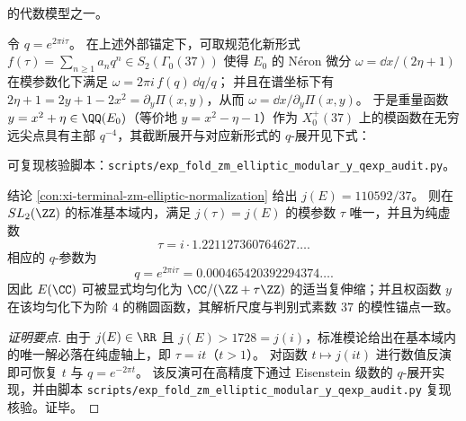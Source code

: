 \begin{remark}
\)
的代数模型之一。\cite{LMFDBEllipticCurve37a1}
\par
令 \(q=e^{2\pi i\tau}\)。
在上述外部锚定下，可取规范化新形式 \(f(\tau)=\sum_{n\ge 1}a_n q^n\in S_2(\Gamma_0(37))\) 使得 \(E_0\) 的 N\'eron 微分 \(\omega=\dd x/(2\eta+1)\) 在模参数化下满足
\(
\omega=2\pi i\, f(q)\,\dd q/q
\)；
并且在谱坐标下有 \(2\eta+1=2y+1-2x^2=\partial_y\Pi(x,y)\)，从而 \(\omega=\dd x/\partial_y\Pi(x,y)\)。
于是重量函数 \(y=x^{2}+\eta\in\QQ(E_0)\)（等价地 \(y=x^{2}-\eta-1\)）作为 \(X_0^+(37)\) 上的模函数在无穷远尖点具有主部 \(q^{-4}\)，其截断展开与对应新形式的 \(q\)-展开见下式：

可复现核验脚本：\texttt{scripts/exp\_fold\_zm\_elliptic\_modular\_y\_qexp\_audit.py}。
\end{remark}

\begin{conclusion}\label{con:xi-terminal-zm-elliptic-j-inversion-tau}
结论 \ref{con:xi-terminal-zm-elliptic-normalization} 给出
\(
j(E)=110592/37
\)。
则在 \(SL_{2}(\ZZ)\) 的标准基本域内，满足 \(j(\tau)=j(E)\) 的模参数 \(\tau\) 唯一，并且为纯虚数
\[
\tau=i\cdot 1.221127360764627\ldots.
\]
相应的
\(
q
\)-参数为
\[
q=e^{2\pi i\tau}=0.000465420392294374\ldots.
\]
因此 \(E(\CC)\) 可被显式均匀化为 \(\CC/(\ZZ+\tau\ZZ)\) 的适当复伸缩；并且权函数 \(y\) 在该均匀化下为阶 \(4\) 的椭圆函数，其解析尺度与判别式素数 \(37\) 的模性锚点一致。
\end{conclusion}
\begin{proof}[证明要点]
由于 \(j(E)\in\RR\) 且 \(j(E)>1728=j(i)\)，标准模论给出在基本域内的唯一解必落在纯虚轴上，即 \(\tau=it\)（\(t>1\)）。
对函数 \(t\mapsto j(it)\) 进行数值反演即可恢复 \(t\) 与 \(q=e^{-2\pi t}\)。
该反演可在高精度下通过 Eisenstein 级数的 \(q\)-展开实现，并由脚本 \texttt{scripts/exp\_fold\_zm\_elliptic\_modular\_y\_qexp\_audit.py} 复现核验。证毕。
\end{proof}

